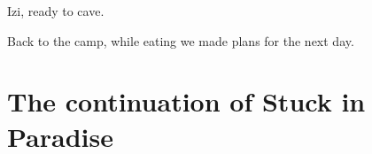 \begin{marginfigure}
\checkoddpage \ifoddpage \forcerectofloat \else \forceversofloat \fi
\centering
 \caption{Izi, ready to cave. }
 \label{izi ready}
\end{marginfigure}

Back to the camp, while eating we made plans for the next day. 


\section{The continuation of Stuck in Paradise}

